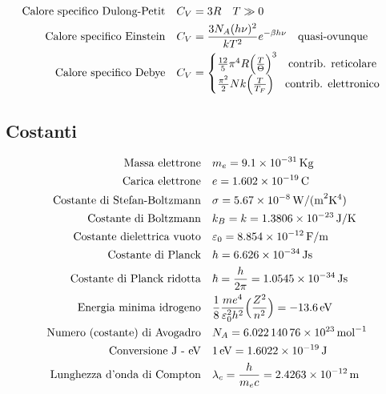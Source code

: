 \begin{equation}
\begin{split}
\mbox{Calore specifico Dulong-Petit} & \quad C_V = 3R \quad T \gg 0 \\
\mbox{Calore specifico Einstein} & \quad C_V = \frac{ 3 N_A (h\nu)^2}{kT^2 } e^{ -\beta h \nu } \quad \mbox{quasi-ovunque} \\
\mbox{Calore specifico Debye} & \quad C_V = 
\begin{cases}
\frac{ 12}{5 } \pi^4 R \Bigl(  \frac{ T}{\Theta }  \Bigr)^3 \quad \mbox{contrib. reticolare} \\
\frac{ \pi^2}{2 } N k \Bigl(  \frac{ T}{T_F}  \Bigr) \quad \mbox{contrib. elettronico} 
\end{cases} \\
\end{split}
\end{equation}


\subsection{Costanti}
\begin{equation}
\begin{split}
\mbox{Massa elettrone} & \quad m_e = \SI{9.1e-31}{Kg} \\
\mbox{Carica elettrone} & \quad e = \SI{1.602e-19}{C} \\
\mbox{Costante di Stefan-Boltzmann} & \quad \sigma = \SI{5.67e-8}{W / ( m^2 K^4)} \\
\mbox{Costante di Boltzmann} & \quad k_B = k = \SI{1.3806e-23}{J / K} \\
\mbox{Costante dielettrica vuoto} & \quad \varepsilon_0 = \SI{8.854e-12}{F/m} \\
\mbox{Costante di Planck} & \quad h = \SI{6.626e-34}{J s} \\
\mbox{Costante di Planck ridotta} & \quad \hbar = \frac{ h}{2\pi } = \SI{1.0545e-34}{J s} \\
\mbox{Energia minima idrogeno} & \quad \frac{ 1}{8 }\frac{m e^4 }{\varepsilon_0^2 h^2 } \Bigl(  \frac{ Z^2}{n^2 }  \Bigr)= \SI{-13.6e0}{eV} \\
\mbox{Numero (costante) di Avogadro} & \quad N_A = \SI{6.02214076e23}{mol^{-1}} \\
\mbox{Conversione J - eV} & \quad \SI{1 }{eV} = \SI{1.6022e-19}{J} \\
\mbox{Lunghezza d'onda di Compton} & \quad \lambda_c = \frac{ h}{m_e c } = \SI{2.4263e-12}{m} \\
\end{split}
\end{equation}

